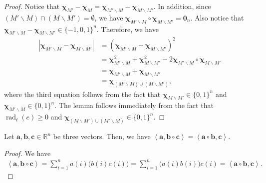 \documentclass{article}
\newcommand{\del}{\backslash}
\newcommand{\RR}{\mathbb R}
\DeclareMathOperator{\rad}{rad}
\newcommand{\inn}[1]{\left\langle #1 \right\rangle}
\renewcommand{\vec}[1]{\boldsymbol{#1}}
\renewcommand{\odot}{\circ}
\begin{document}
\begin{proof}
Notice that $\vec\chi_{M'}-\vec\chi_{M} = \vec\chi_{M'\del M}-\vec\chi_{M\del M'}$.
In addition, since $(M'\del M) \cap (M\del M') = \emptyset$, we have
$\vec \chi_{M'\del M} \odot \vec\chi_{M\del M'} = \vec 0_n$. 
Also notice that $ \vec\chi_{M'\del M}-\vec\chi_{M\del M'} \in \{-1,0,1\}^n$.
Therefore, we have
\begin{align*}
|\vec\chi_{M'\del M}-\vec\chi_{M\del M'}| 
&= (\vec\chi_{M'\del M}-\vec\chi_{M\del M'})^2\\
&=\vec\chi_{M'\del M}^2+\vec\chi_{M\del M'}^2-2\vec \chi_{M'\del M} \odot \vec\chi_{M\del M'} \\
&=\vec\chi_{M'\del M}+\vec\chi_{M\del M'}\\
& = \vec\chi_{(M' \del M) \cup (M\del M')},
\end{align*}
where the third equation follows from the fact that $\vec\chi_{M\del M'}\in \{0,1\}^n$ and $\vec\chi_{M'\del M}\in\{0,1\}^n$.
The lemma follows immediately from the fact that $\rad_t(e) \ge 0$ and  $\vec\chi_{(M\del M')\cup(M'\del M)}\in \{0,1\}^n$.
\end{proof}

\begin{lemma}
\label{lemma:vector-technical}
Let $\vec a,\vec b, \vec c \in \RR^n$ be three vectors.
Then, we have $\inn{\vec a, \vec b\odot \vec c} = \inn{\vec a\odot \vec b,\vec c}$.
\end{lemma}

\begin{proof}
We have
\begin{align*}
	\inn{\vec a,\vec b\odot \vec c} = \sum_{i=1}^n a(i) \big(b(i) c(i)\big) = \sum_{i=1}^n \big(a(i)b(i)\big)c(i) = \inn{\vec a\odot\vec b,\vec c}.
\end{align*}
\end{proof}
\end{document}
